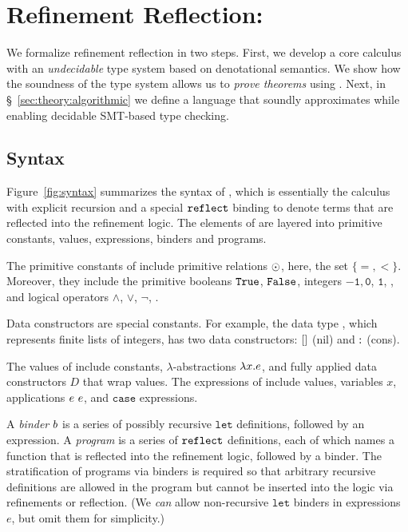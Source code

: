 \section{Refinement Reflection: \corelan}
\label{sec:formalism}
\label{sec:types-reflection}
\label{sec:theory}

We formalize refinement reflection in two steps.
%
First, we develop a core calculus \corelan with an
\emph{undecidable} type system based on denotational
semantics. We show how the soundness of the type system
allows us to \emph{prove theorems} using \corelan.
%
Next, in \S~\ref{sec:theory:algorithmic} we define
a language \smtlan that soundly approximates \corelan
while enabling decidable SMT-based type checking.


\subsection{Syntax}

%
Figure~\ref{fig:syntax} summarizes the syntax of \corelan,
which is essentially the calculus \undeclang~\cite{Vazou14}
with explicit recursion and a special $\mathtt{reflect}$ binding
to denote terms that are reflected into the refinement logic.
%
The elements of \corelan are layered into
primitive constants, values, expressions, binders
and programs.

The primitive constants of \corelan
include primitive relations $\odot$,
here, the set $\{ =, <\}$.
%
Moreover, they include the
primitive booleans $\mathtt{True}$, $\mathtt{False}$,
integers $\mathtt{-1}, \mathtt{0}$, $\mathtt{1}$, \etc,
and logical operators $\mathtt{\land}$, $\mathtt{\lor}$, $\mathtt{\lnot}$, \etc.

%
Data constructors are special constants.
For example, the data type \tintlist, which represents
finite lists of integers, has two data constructors: $[]$ (nil)
and $:$ (cons).

%
The values of \corelan include
constants, $\lambda$-abstractions
$\lambda x. e$, and fully
applied data constructors $D$
that wrap values.
%
The expressions of \corelan
include values, variables $x$,
applications $e \ e$, and
$\mathtt{case}$ expressions.

%
A \emph{binder} $b$ is a series of possibly recursive
$\mathtt{let}$ definitions, followed by an expression.
%
A \emph{program} \prog is a series of $\mathtt{reflect}$
definitions, each of which names a function
that is reflected into the refinement
logic, followed by a binder.
%
The stratification of programs via binders
is required so that arbitrary recursive definitions
are allowed in the program but cannot be inserted into the logic
via refinements or reflection.
%
(We \emph{can} allow non-recursive $\mathtt{let}$
binders in expressions $e$, but omit them for simplicity.)

